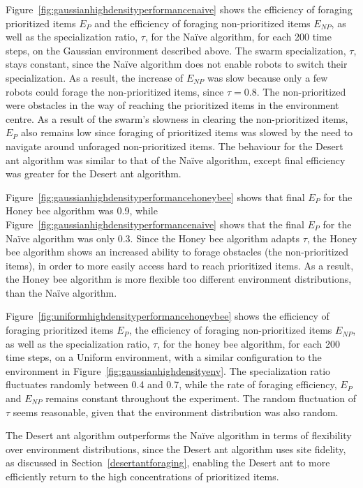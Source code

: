 Figure~\ref{fig:gaussianhighdensityperformancenaive} shows the efficiency of foraging prioritized items $E_P$ and the efficiency of foraging non-prioritized items $E_{NP}$, as well as the specialization ratio, $\tau$, for the Na\"ive algorithm, for each 200 time steps, on the Gaussian environment described above. The swarm specialization, $\tau$, stays constant, since the Na\"ive algorithm does not enable robots to switch their specialization. As a result, the increase of $E_{NP}$ was slow because only a few robots could forage the non-prioritized items, since $\tau=0.8$. The non-prioritized were obstacles in the way of reaching the prioritized items in the environment centre. As a result of the swarm's slowness in clearing the non-prioritized items, $E_P$ also remains low since foraging of prioritized items was slowed by the need to navigate around unforaged non-prioritized items. The behaviour for the Desert ant algorithm was similar to that of the Na\"ive algorithm, except final efficiency was greater for the Desert ant algorithm.

Figure~\ref{fig:gaussianhighdensityperformancehoneybee} shows that final $E_P$ for the Honey bee algorithm was 0.9, while Figure~\ref{fig:gaussianhighdensityperformancenaive} shows that the final $E_P$ for the Na\"ive algorithm was only 0.3. Since the Honey bee algorithm adapts $\tau$, the Honey bee algorithm shows an increased ability to forage obstacles (the non-prioritized items), in order to more easily access hard to reach prioritized items. As a result, the Honey bee algorithm is more flexible too different environment distributions, than the Na\"ive algorithm.

Figure~\ref{fig:uniformhighdensityperformancehoneybee} shows the efficiency of foraging prioritized items $E_P$, the efficiency of foraging non-prioritized items $E_{NP}$, as well as the specialization ratio, $\tau$, for the honey bee algorithm, for each 200 time steps, on a Uniform environment, with a similar configuration to the environment in Figure~\ref{fig:gaussianhighdensityenv}. The specialization ratio fluctuates randomly between 0.4 and 0.7, while the rate of foraging efficiency, $E_P$ and $E_{NP}$ remains constant throughout the experiment. The random fluctuation of $\tau$ seems reasonable, given that the environment distribution was also random.

The Desert ant algorithm outperforms the Na\"ive algorithm in terms of flexibility over environment distributions, since the Desert ant algorithm uses site fidelity, as discussed in Section~\ref{desertantforaging}, enabling the Desert ant to more efficiently return to the high concentrations of prioritized items.


